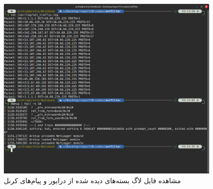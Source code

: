 \documentclass[12pt]{article}
\begin{document}
	\begin{figure}[H]
		\centering
		\includegraphics[width=\textwidth]{report10-resources/screenshots/7.png}
		\caption{مشاهده فایل لاگ بسته‌های دیده شده از درایور و پیام‌های کرنل}
		\label{img:7}
	\end{figure}
        
	\newpage
	\begin{LTR}
		\printbibliography[title={مراجع}]
	\end{LTR}

	
\end{document}
